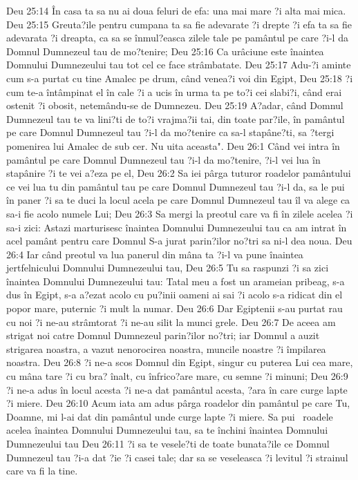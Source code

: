 Deu 25:14  În casa ta sa nu ai doua feluri de efa: una mai mare ?i alta mai mica.
Deu 25:15  Greuta?ile pentru cumpana ta sa fie adevarate ?i drepte ?i efa ta sa fie adevarata ?i dreapta, ca sa se înmul?easca zilele tale pe pamântul pe care ?i-l da Domnul Dumnezeul tau de mo?tenire;
Deu 25:16  Ca urâciune este înaintea Domnului Dumnezeului tau tot cel ce face strâmbatate.
Deu 25:17  Adu-?i aminte cum s-a purtat cu tine Amalec pe drum, când venea?i voi din Egipt,
Deu 25:18  ?i cum te-a întâmpinat el în cale ?i a ucis în urma ta pe to?i cei slabi?i, când erai ostenit ?i obosit, netemându-se de Dumnezeu.
Deu 25:19  A?adar, când Domnul Dumnezeul tau te va lini?ti de to?i vrajma?ii tai, din toate par?ile, în pamântul pe care Domnul Dumnezeul tau ?i-l da mo?tenire ca sa-l stapâne?ti, sa ?tergi pomenirea lui Amalec de sub cer. Nu uita aceasta".
Deu 26:1  Când vei intra în pamântul pe care Domnul Dumnezeul tau ?i-l da mo?tenire, ?i-l vei lua în stapânire ?i te vei a?eza pe el,
Deu 26:2  Sa iei pârga tuturor roadelor pamântului ce vei lua tu din pamântul tau pe care Domnul Dumnezeul tau ?i-l da, sa le pui în paner ?i sa te duci la locul acela pe care Domnul Dumnezeul tau îl va alege ca sa-i fie acolo numele Lui;
Deu 26:3  Sa mergi la preotul care va fi în zilele acelea ?i sa-i zici: Astazi marturisesc înaintea Domnului Dumnezeului tau ca am intrat în acel pamânt pentru care Domnul S-a jurat parin?ilor no?tri sa ni-l dea noua.
Deu 26:4  Iar când preotul va lua panerul din mâna ta ?i-l va pune înaintea jertfelnicului Domnului Dumnezeului tau,
Deu 26:5  Tu sa raspunzi ?i sa zici înaintea Domnului Dumnezeului tau: Tatal meu a fost un arameian pribeag, s-a dus în Egipt, s-a a?ezat acolo cu pu?inii oameni ai sai ?i acolo s-a ridicat din el popor mare, puternic ?i mult la numar.
Deu 26:6  Dar Egiptenii s-au purtat rau cu noi ?i ne-au strâmtorat ?i ne-au silit la munci grele.
Deu 26:7  De aceea am strigat noi catre Domnul Dumnezeul parin?ilor no?tri; iar Domnul a auzit strigarea noastra, a vazut nenorocirea noastra, muncile noastre ?i împilarea noastra.
Deu 26:8  ?i ne-a scos Domnul din Egipt, singur cu puterea Lui cea mare, cu mâna tare ?i cu bra? înalt, cu înfrico?are mare, cu semne ?i minuni;
Deu 26:9  ?i ne-a adus în locul acesta ?i ne-a dat pamântul acesta, ?ara în care curge lapte ?i miere.
Deu 26:10  Acum iata am adus pârga roadelor din pamântul pe care Tu, Doamne, mi l-ai dat din pamântul unde curge lapte ?i miere. Sa pui  roadele acelea înaintea Domnului Dumnezeului tau, sa te închini înaintea Domnului Dumnezeului tau
Deu 26:11  ?i sa te vesele?ti de toate bunata?ile ce Domnul Dumnezeul tau ?i-a dat ?ie ?i casei tale; dar sa se veseleasca ?i levitul ?i strainul care va fi la tine.
